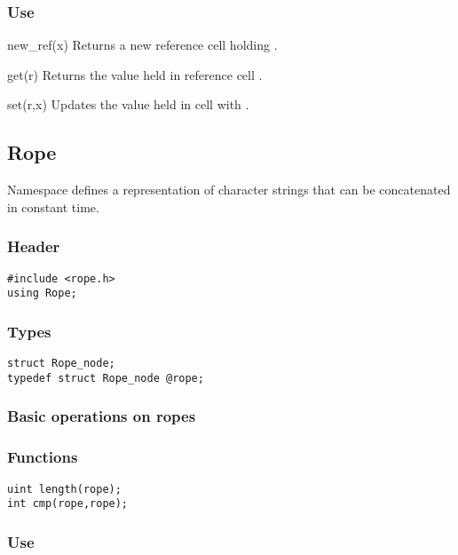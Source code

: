 \subsubsection*{Use}

\begin{defun}{new_ref}{(x)}
Returns a new reference cell holding .
\end{defun}

\begin{defun}{get}{(r)}
Returns the value held in reference cell .
\end{defun}

\begin{defun}{set}{(r,x)}
Updates the value held in cell  with .
\end{defun}

\subsection{Rope}

Namespace  defines a representation of character strings that
can be concatenated in constant time.

\subsubsection*{Header}
\begin{verbatim}
#include <rope.h>
using Rope;
\end{verbatim}

\subsubsection*{Types}
\begin{verbatim}
struct Rope_node;
typedef struct Rope_node @rope;
\end{verbatim}


\subsubsection*{Basic operations on ropes}
\subsubsection*{Functions}
\begin{verbatim}
uint length(rope);
int cmp(rope,rope);
\end{verbatim}

\subsubsection*{Use}

